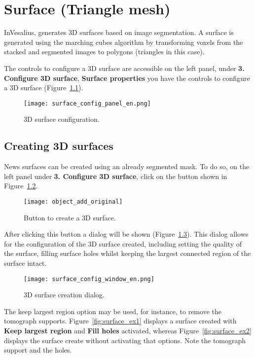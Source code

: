 \chapter{Surface (Triangle mesh)}
\label{cap_surface}

InVesalius, generates 3D surfaces based on image segmentation. A surface is generated using the marching cubes algorithm by transforming voxels from the stacked and segmented images to polygons (triangles in this case).

The controls to configure a 3D surface are accessible on the left panel, under \textbf{3. Configure 3D surface}, \textbf{Surface properties} you have the controls to configure a 3D surface (Figure~\ref{fig:3d_surface_managment}).

\begin{figure}[!htb]
\centering
\texttt{[image: surface\_config\_panel\_en.png]}
\caption{3D surface configuration.}
\label{fig:3d_surface_managment}
\end{figure}


\section{Creating 3D surfaces}

News surfaces can be created using an already segmented mask. To do so, on the left panel under \textbf{3. Configure 3D surface}, click on the button shown in Figure~\ref{fig:shortcut_new_surface}.

\begin{figure}[!htb]
\centering
\texttt{[image: object\_add\_original]}
\caption{Button to create a 3D surface.}
\label{fig:shortcut_new_surface}
\end{figure}

After clicking this button a dialog will be shown (Figure~\ref{fig:create_surface_1}). This dialog allows for the configuration of the 3D surface created, including setting the quality of the surface, filling surface holes whilst keeping the largest connected region of the surface intact.

\begin{figure}[!htb]
\centering
\texttt{[image: surface\_config\_window\_en.png]}
\caption{3D surface creation dialog.}
\label{fig:create_surface_1}
\end{figure}

The keep largest region option may be used, for instance, to remove the tomograph supports. Figure~\ref{fig:surface_ex1} displays a surface created with \textbf{Keep largest region} and \textbf{Fill holes} activated, whereas Figure~\ref{fig:surface_ex2} displays the surface create without activating that options. Note the tomograph support and the holes.


